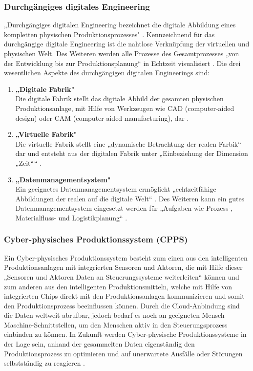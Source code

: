 \subsubsection{Durchgängiges digitales Engineering}\label{sec:DigitalesEngineering}
„Durchgängiges digitalen Engineering bezeichnet die digitale Abbildung eines kompletten physischen Produktionsprozesses" \cite[S.41]{14}. Kennzeichnend für das durchgängige digitale Engineering ist die nahtlose Verknüpfung der virtuellen und physischen Welt. Des Weiteren werden alle Prozesse des Gesamtprozesses „von der Entwicklung bis zur Produktionsplanung“ \cite[S.41]{14} in Echtzeit visualisiert \cite[S.41]{14}.
\newline
Die drei wesentlichen Aspekte des durchgängigen digitalen Engineerings sind:
\begin{enumerate}
	\item \textbf{„Digitale Fabrik"} \cite[S.41]{14} \\ 
	Die digitale Fabrik stellt das digitale Abbild der gesamten physischen Produktionsanlage, mit Hilfe von Werkzeugen wie CAD (computer-aided design) oder CAM (computer-aided manufacturing), dar \cite[S.41]{14}.
	\item \textbf{„Virtuelle Fabrik"} \cite[S.41]{14} \\
	Die virtuelle Fabrik stellt eine „dynamische Betrachtung der realen Farbik“ \cite[S.41]{14} dar und entsteht aus der digitalen Fabrik unter „Einbeziehung der Dimension „Zeit““ \cite[S.41]{14}.
	\item \textbf{„Datenmanagementsystem"} \cite[S.41]{14} \\
	Ein geeignetes Datenmanagementsystem ermöglicht „echtzeitfähige Abbildungen der realen auf die digitale Welt“ \cite[S.41]{14}. Des Weiteren kann ein gutes Datenmanagementsystem eingesetzt werden für „Aufgaben wie Prozess-, Materialfluss- und Logistikplanung“ \cite[S.41]{14}.
\end{enumerate}

\subsubsection{Cyber-physisches Produktionssystem (CPPS)}\label{sec:CPPS}
Ein Cyber-physisches Produktionssystem besteht zum einen aus den intelligenten Produktionsanlagen mit integrierten Sensoren und Aktoren, die mit Hilfe dieser „Sensoren und Aktoren Daten an Steuerungssysteme weiterleiten“ \cite[S.42]{14} können und zum anderen aus den intelligenten Produktionsmitteln, welche mit Hilfe von integrierten Chips direkt mit den Produktionsanlagen kommunizieren und somit den Produktionsprozess beeinflussen können. Durch die Cloud-Anbindung sind die Daten weltweit abrufbar, jedoch bedarf es noch an geeigneten Mensch-Maschine-Schnittstellen, um den Menschen aktiv in den Steuerungsprozess einbinden zu können. In Zukunft werden Cyber-physische Produktionssysteme in der Lage sein, anhand der gesammelten Daten eigenständig den Produktionsprozess zu optimieren und auf unerwartete Ausfälle oder Störungen selbstständig zu reagieren \cite[S.42]{14}.
\newpage

